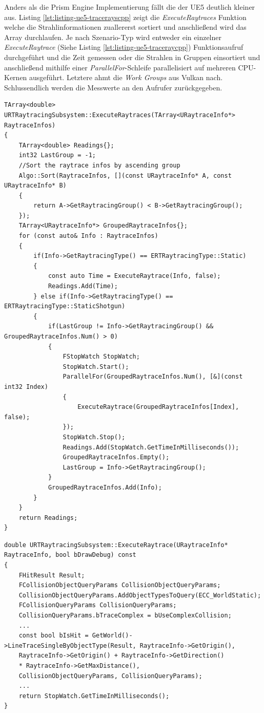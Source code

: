\documentclass[11pt]{scrartcl}
\begin{document}
	Anders als die Prism Engine Implementierung fällt die der UE5 deutlich kleiner aus. Listing \ref{lst:listing-ue5-tracerayscpp} zeigt die \textit{ExecuteRaytraces} Funktion welche die Strahlinformationen zuallererst sortiert und anschließend wird das Array durchlaufen. Je nach Szenario-Typ wird entweder ein einzelner \textit{ExecuteRaytrace} (Siehe Listing \ref{lst:listing-ue5-traceraycpp}) Funktionsaufruf durchgeführt und die Zeit gemessen oder die Strahlen in Gruppen einsortiert und anschließend mithilfe einer \textit{ParallelFor}-Schleife\cite{IsaraTech} parallelisiert auf mehreren CPU-Kernen ausgeführt. Letztere ahmt die \textit{Work Groups} aus Vulkan nach. Schlussendlich werden die Messwerte an den Aufrufer zurückgegeben.
	
	\begin{lstlisting}[caption={\textit{ExecuteRaytraces} Funktion in RTRaytracingSubsystem.cpp},label={lst:listing-ue5-tracerayscpp}]
TArray<double> URTRaytracingSubsystem::ExecuteRaytraces(TArray<URaytraceInfo*> RaytraceInfos)
{
	TArray<double> Readings{};
	int32 LastGroup = -1;
	//Sort the raytrace infos by ascending group
	Algo::Sort(RaytraceInfos, [](const URaytraceInfo* A, const URaytraceInfo* B)
	{
		return A->GetRaytracingGroup() < B->GetRaytracingGroup();
	});
	TArray<URaytraceInfo*> GroupedRaytraceInfos{};
	for (const auto& Info : RaytraceInfos)
	{
		if(Info->GetRaytracingType() == ERTRaytracingType::Static)
		{
			const auto Time = ExecuteRaytrace(Info, false);
			Readings.Add(Time);
		} else if(Info->GetRaytracingType() == ERTRaytracingType::StaticShotgun)
		{
			if(LastGroup != Info->GetRaytracingGroup() && GroupedRaytraceInfos.Num() > 0)
			{
				FStopWatch StopWatch;
				StopWatch.Start();
				ParallelFor(GroupedRaytraceInfos.Num(), [&](const int32 Index)
				{
					ExecuteRaytrace(GroupedRaytraceInfos[Index], false);
				});
				StopWatch.Stop();
				Readings.Add(StopWatch.GetTimeInMilliseconds());
				GroupedRaytraceInfos.Empty();
				LastGroup = Info->GetRaytracingGroup();
			}
			GroupedRaytraceInfos.Add(Info);
		}
	}
	return Readings;
}	\end{lstlisting}

	\begin{lstlisting}[caption={\textit{ExecuteRaytrace} Funktion in RTRaytracingSubsystem.cpp}, label=lst:listing-ue5-traceraycpp]
double URTRaytracingSubsystem::ExecuteRaytrace(URaytraceInfo* RaytraceInfo, bool bDrawDebug) const
{
	FHitResult Result;
	FCollisionObjectQueryParams CollisionObjectQueryParams;
	CollisionObjectQueryParams.AddObjectTypesToQuery(ECC_WorldStatic);
	FCollisionQueryParams CollisionQueryParams;
	CollisionQueryParams.bTraceComplex = bUseComplexCollision;
	...
	const bool bIsHit = GetWorld()->LineTraceSingleByObjectType(Result, RaytraceInfo->GetOrigin(),
	RaytraceInfo->GetOrigin() + RaytraceInfo->GetDirection()
	* RaytraceInfo->GetMaxDistance(),
	CollisionObjectQueryParams, CollisionQueryParams);
	...
	return StopWatch.GetTimeInMilliseconds();
}	\end{lstlisting}
\end{document}

